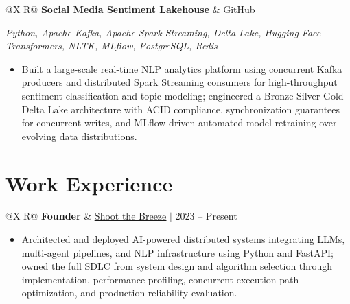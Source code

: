 \documentclass[a4paper,10pt]{article}
\newcommand{\ulink}[2]{\href{#1}{\uline{#2}}}
\newcommand{\subheading}[1]{{\color[HTML]{0A0A0A}\fontsize{12}{14}\selectfont\bfseries #1}}
\newcommand{\techstack}[1]{{\color[HTML]{5C5C5C}\fontsize{10.5}{12.5}\selectfont\itshape #1}}
\newcommand{\meta}[1]{{\color[HTML]{5C5C5C}\fontsize{10.5}{12.5}\selectfont #1}}
\begin{document}
\begin{tabularx}{\linewidth}{@{}X R@{}}
  \subheading{Social Media Sentiment Lakehouse} &
  \meta{\ulink{https://github.com/su-jin1425/Social-Media-Sentiment-Lakehouse}{GitHub}}
\end{tabularx}
\vspace{1pt}
\techstack{Python, Apache Kafka, Apache Spark Streaming, Delta Lake, Hugging Face Transformers, NLTK, MLflow, PostgreSQL, Redis}
\begin{itemize}[nosep, leftmargin=1.5em, itemsep=1pt, topsep=2pt]
  \item {\color[HTML]{0A0A0A}\fontsize{11}{14}\selectfont Built a large-scale real-time NLP analytics platform using concurrent Kafka producers and distributed Spark Streaming consumers for high-throughput sentiment classification and topic modeling; engineered a Bronze-Silver-Gold Delta Lake architecture with ACID compliance, synchronization guarantees for concurrent writes, and MLflow-driven automated model retraining over evolving data distributions.}
\end{itemize}

\vspace{2pt}

\section{Work Experience}
\vspace{2pt}

\begin{tabularx}{\linewidth}{@{}X R@{}}
  \subheading{Founder} &
  \meta{\ulink{https://shoot-the-breeze.vercel.app}{Shoot the Breeze} $|$ 2023 -- Present}
\end{tabularx}
\begin{itemize}[nosep, leftmargin=1.5em, itemsep=1pt, topsep=2pt]
  \item {\color[HTML]{0A0A0A}\fontsize{11}{14}\selectfont Architected and deployed AI-powered distributed systems integrating LLMs, multi-agent pipelines, and NLP infrastructure using Python and FastAPI; owned the full SDLC from system design and algorithm selection through implementation, performance profiling, concurrent execution path optimization, and production reliability evaluation.}
\end{itemize}

\vspace{4pt}
\end{document}
